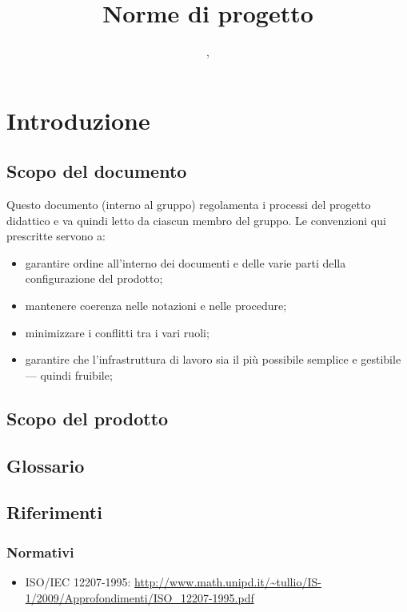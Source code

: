 


\author{\GG, \MM}
\supervisor{\LB, \AZ}
\title{Norme di progetto}


\maketitle

\tableofcontents

\section{Introduzione}

\subsection{Scopo del documento}
Questo documento (interno al gruppo) regolamenta i processi del progetto didattico e va quindi letto da ciascun membro del gruppo. Le convenzioni qui prescritte servono a:
\begin{itemize}
	\item garantire ordine all'interno dei documenti e delle varie parti della configurazione del prodotto;
	\item mantenere coerenza nelle notazioni e nelle procedure;
	\item minimizzare i conflitti tra i vari ruoli;
	\item garantire che l'infrastruttura di lavoro sia il più possibile semplice e gestibile --- quindi fruibile;
\end{itemize}

\subsection{Scopo del prodotto}
\scopo %

	\subsection{Glossario}
	\subsection{Riferimenti}
		\subsubsection{Normativi}
		\begin{itemize}
		\item ISO/IEC 12207-1995: \url{http://www.math.unipd.it/\~tullio/IS-1/2009/Approfondimenti/ISO_12207-1995.pdf}
		\end{itemize}

